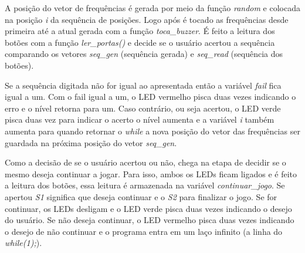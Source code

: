 \documentclass[conference]{IEEEtran}
\begin{document}
A posição do vetor de frequências é gerada por meio da função \emph{random} e colocada na posição \emph{i} da sequência de posições. Logo após é tocado as frequências desde  primeira até a atual gerada com a função \emph{toca\_buzzer}. É feito a leitura dos botões com a função \emph{ler\_portas()} e decide se o usuário acertou a sequência comparando os vetores \emph{seq\_gen} (sequência gerada) e \emph{seq\_read} (sequência dos botões).

Se a sequência digitada não for igual ao apresentada então a variável \emph{fail} fica igual a um. Com o fail igual a um, o LED vermelho pisca duas vezes indicando o erro e o nível retorna para um. Caso contrário, ou seja acertou, o LED verde pisca duas vez para indicar o acerto o nível aumenta e a variável \emph{i} também aumenta para quando retornar o \emph{while} a nova posição do vetor das frequências ser guardada na próxima posição do vetor \emph{seq\_gen}. 

Como a decisão de se o usuário acertou ou não, chega na etapa de decidir se o mesmo deseja continuar a jogar. Para isso, ambos os LEDs ficam ligados e é feito a leitura dos botões, essa leitura é armazenada na variável \emph{continuar\_jogo}. Se apertou \emph{S1} significa que deseja continuar e o \emph{S2} para finalizar o jogo. Se for continuar, os LEDs desligam e o LED verde pisca duas vezes indicando o desejo do usuário. Se não deseja continuar, o LED vermelho pisca duas vezes indicando o desejo de não continuar e o programa entra em um laço infinito (a linha do \emph{while(1);}).




%
%
\end{document}
